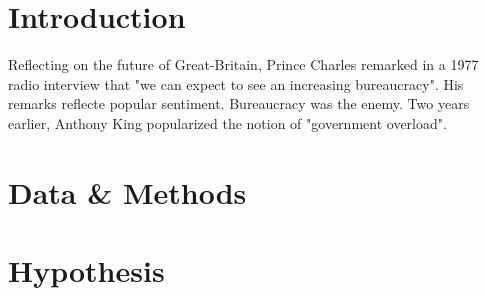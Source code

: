\documentclass{article}
\begin{document}
\section{Introduction}
Reflecting on the future of Great-Britain, Prince Charles remarked in a 1977 radio interview that "we can expect to see an increasing bureaucracy". His remarks reflecte popular sentiment. Bureaucracy was the enemy. Two years earlier, Anthony King popularized the notion of "government overload".


\section{Data \& Methods}

\section{Hypothesis}
\end{document}
